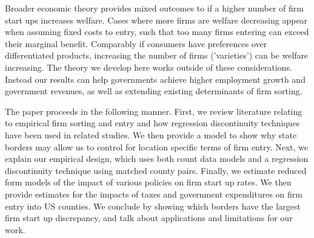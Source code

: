 Broader economic theory provides mixed outcomes to if a higher number of firm start ups increases welfare. Cases where more firms are welfare decreasing appear when assuming fixed costs to entry, such that too many firms entering can exceed their marginal benefit. Comparably if consumers have preferences over differentiated products, increasing the number of firms ('varieties') can be welfare increasing. The theory we develop here works outside of these considerations. Instead our results can help governments achieve higher employment growth and government revenues, as well as extending existing determinants of firm sorting.

The paper proceeds in the following manner. First, we review literature relating to empirical firm sorting and entry and how regression discontinuity techniques have been used in related studies. We then provide a model to show why state borders may allow us to control for location specific terms of firm entry. Next, we explain our empirical design, which uses both count data models  and a regression discontinuity technique using matched county pairs. Finally, we estimate reduced form models of the impact of various policies on firm start up rates. We then provide estimates for the impacts of taxes and government expenditures on firm entry into US counties. We conclude by showing which borders have the largest firm start up discrepancy, and talk about applications and limitations for our work.